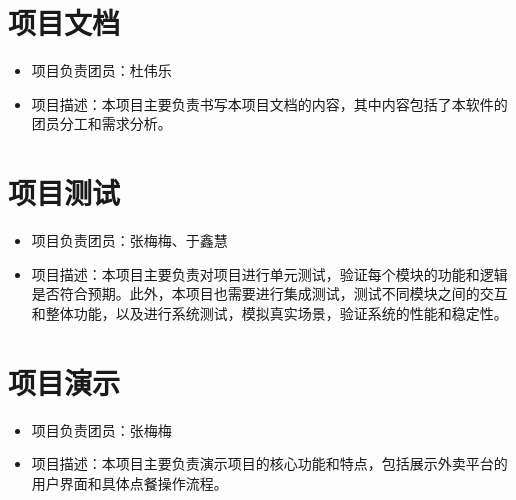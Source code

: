 \section{项目文档}
\begin{itemize}
    \item{项目负责团员}：杜伟乐
    \item{项目描述}：本项目主要负责书写本项目文档的内容，其中内容包括了本软件的团员分工和需求分析。
\end{itemize}

\section{项目测试}
\begin{itemize}
    \item{项目负责团员}：张梅梅、于鑫慧
    \item{项目描述}：本项目主要负责对项目进行单元测试，验证每个模块的功能和逻辑是否符合预期。此外，本项目也需要进行集成测试，测试不同模块之间的交互和整体功能，以及进行系统测试，模拟真实场景，验证系统的性能和稳定性。
\end{itemize}

\section{项目演示}
\begin{itemize}
    \item{项目负责团员}：张梅梅
    \item{项目描述}：本项目主要负责演示项目的核心功能和特点，包括展示外卖平台的用户界面和具体点餐操作流程。
\end{itemize}






